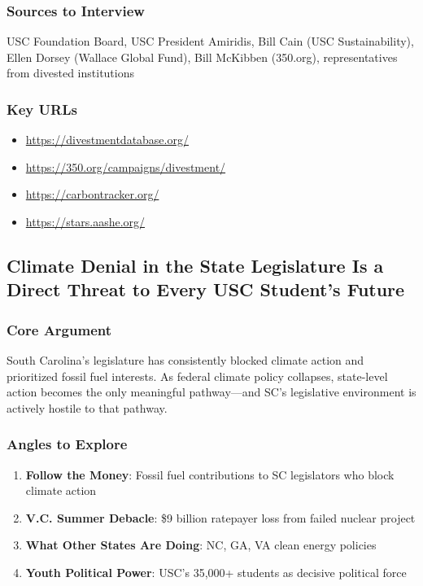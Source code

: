 \documentclass[11pt,letterpaper]{article}
\begin{document}
\subsubsection*{Sources to Interview}
USC Foundation Board, USC President Amiridis, Bill Cain (USC Sustainability), Ellen Dorsey (Wallace Global Fund), Bill McKibben (350.org), representatives from divested institutions

\subsubsection*{Key URLs}
\begin{itemize}[noitemsep]
    \item \url{https://divestmentdatabase.org/}
    \item \url{https://350.org/campaigns/divestment/}
    \item \url{https://carbontracker.org/}
    \item \url{https://stars.aashe.org/}
\end{itemize}

\newpage
\subsection{Climate Denial in the State Legislature Is a Direct Threat to Every USC Student's Future}

\subsubsection*{Core Argument}
South Carolina's legislature has consistently blocked climate action and prioritized fossil fuel interests. As federal climate policy collapses, state-level action becomes the only meaningful pathway---and SC's legislative environment is actively hostile to that pathway.

\subsubsection*{Angles to Explore}
\begin{enumerate}[noitemsep]
    \item \textbf{Follow the Money}: Fossil fuel contributions to SC legislators who block climate action
    \item \textbf{V.C. Summer Debacle}: \$9 billion ratepayer loss from failed nuclear project
    \item \textbf{What Other States Are Doing}: NC, GA, VA clean energy policies
    \item \textbf{Youth Political Power}: USC's 35,000+ students as decisive political force
\end{enumerate}
\end{document}
